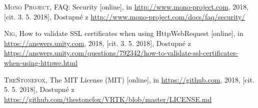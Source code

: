 \documentclass[thesis=B,czech]{FITthesis}[2012/06/26]
\begin{document}
\begin{thebibliography}{999}
  \textsc{Mono Project},
  FAQ: Security [online],
  in \url{http://www.mono-project.com}, 2018,
  [cit. 3. 5. 2018],
  Dostupné z \url{http://www.mono-project.com/docs/faq/security/}
  
  
  \textsc{Nig},
  How to validate SSL certificates when using HttpWebRequest [online],
  in \url{https://answers.unity.com}, 2018,
  [cit. 3. 5. 2018],
  Dostupné z \url{https://answers.unity.com/questions/792342/how-to-validate-ssl-certificates-when-using-httpwe.html}


  \textsc{TheStonefox},
  The MIT License (MIT) [online],
  in \url{https://github.com}, 2018,
  [cit. 5. 5. 2018],
  Dostupné z \url{https://github.com/thestonefox/VRTK/blob/master/LICENSE.md}
  
    
    
  
  
\end{thebibliography}  

\appendix
\end{document}
